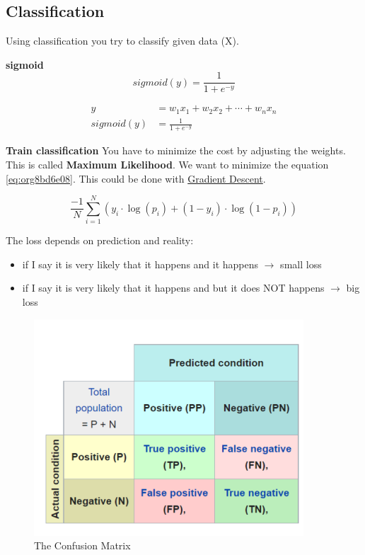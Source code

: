 \documentclass[11pt,twoside,landscape]{article}
\begin{document}
\begin{multicols}{3}
\section{Classification}
\label{sec:org85ba917}
Using classification you try to classify given data (X).

\textbf{sigmoid}
\begin{equation}
  sigmoid(y) = \frac{1}{1 + e^{-y}}
\end{equation}

\begin{align}
  y &= w_1x_1 + w_2x_2 + \cdots + w_nx_n \\
  sigmoid(y) &= \frac{1}{1 + e^{-y}}
\end{align}


\textbf{Train classification}
You have to minimize the cost by adjusting the weights.
This is called \textbf{Maximum Likelihood}.
We want to minimize the equation \ref{eq:org8bd6e08}.
This could be done with \href{../../../roam/20211208163604-gradient_descent.org}{Gradient Descent}.

\begin{equation}
\label{eq:org8bd6e08}
  \frac{-1}{N}\sum_{i=1}^{N}(y_i \cdot \log(p_i) + (1 - y_i)\cdot \log(1-p_i))
\end{equation}

The loss depends on prediction and reality:
\begin{itemize}
\item if I say it is very likely that it happens and it happens \(\rightarrow\) small loss
\item if I say it is very likely that it happens and but it does NOT happens \(\rightarrow\) big loss
\end{itemize}

\begin{figure}[htbp]
\centering
\includegraphics[width=.9\linewidth]{img/confusion_matrix.png}
\caption{The Confusion Matrix}
\end{figure}



\end{multicols}
\end{document}
